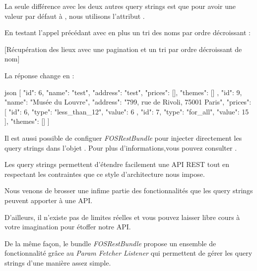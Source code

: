 \documentclass[big]{zmdocument}
\begin{document}
La seule différence avec les deux autres query strings est que pour avoir une valeur par défaut à , nous utilisons l'attribut .



En testant l'appel précédant avec en plus un tri des noms par ordre décroissant :



[Récupération des lieux avec une pagination et un tri par ordre décroissant de nom]


La réponse change en :



\begin{CodeBlock}{json}
[
  {
    "id": 6,
    "name": "test",
    "address": "test",
    "prices": [],
    "themes": []
  },
  {
    "id": 9,
    "name": "Musée du Louvre",
    "address": "799, rue de Rivoli, 75001 Paris",
    "prices": [
      {
        "id": 6,
        "type": "less_than_12",
        "value": 6
      },
      {
        "id": 7,
        "type": "for_all",
        "value": 15
      }
    ],
    "themes": []
  }
]
\end{CodeBlock}



Il est aussi possible de configuer \textit{FOSRestBundle} pour injecter directement les query strings dans l'objet . Pour plus d'informations,vous pouvez consulter .



\horizontalLine



Les query strings permettent d'étendre facilement une API REST tout en respectant les contraintes que ce style d'architecture nous impose.



Nous venons de brosser une infime partie des fonctionnalités que les query strings peuvent apporter à une API.



D'ailleurs, il n'existe pas de limites réelles et vous pouvez laisser libre cours à votre imagination pour étoffer notre API.



De la même façon, le bundle \textit{FOSRestBundle} propose un ensemble de fonctionnalité grâce au \textit{Param Fetcher Listener} qui permettent de gérer les query strings d'une manière assez simple.
\end{document}
